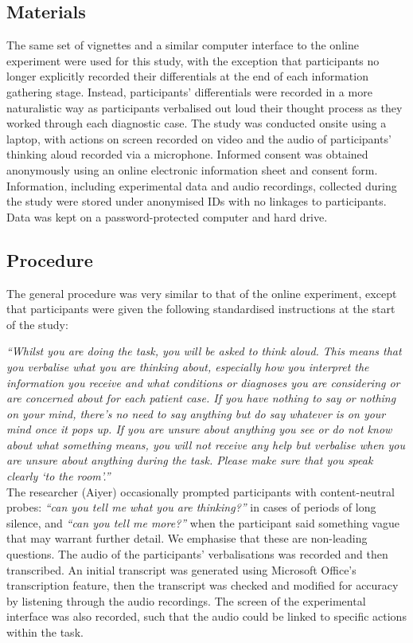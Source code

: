 \documentclass[a4paper, nobind]{templates/ociamthesis}
\begin{document}
\subsection*{Materials}\label{materials-1}

The same set of vignettes and a similar computer interface to the online experiment were used for this study, with the exception that participants no longer explicitly recorded their differentials at the end of each information gathering stage. Instead, participants' differentials were recorded in a more naturalistic way as participants verbalised out loud their thought process as they worked through each diagnostic case. The study was conducted onsite using a laptop, with actions on screen recorded on video and the audio of participants' thinking aloud recorded via a microphone. Informed consent was obtained anonymously using an online electronic information sheet and consent form. Information, including experimental data and audio recordings, collected during the study were stored under anonymised IDs with no linkages to participants. Data was kept on a password-protected computer and hard drive.

\subsection*{Procedure}\label{procedure-1}

The general procedure was very similar to that of the online experiment, except that participants were given the following standardised instructions at the start of the study:

\hfill\break
\emph{``Whilst you are doing the task, you will be asked to think aloud. This means that you verbalise what you are thinking about, especially how you interpret the information you receive and what conditions or diagnoses you are considering or are concerned about for each patient case. If you have nothing to say or nothing on your mind, there's no need to say anything but do say whatever is on your mind once it pops up. If you are unsure about anything you see or do not know about what something means, you will not receive any help but verbalise when you are unsure about anything during the task. Please make sure that you speak clearly `to the room'.''}\\

The researcher (Aiyer) occasionally prompted participants with content-neutral probes: \emph{``can you tell me what you are thinking?''} in cases of periods of long silence, and \emph{``can you tell me more?''} when the participant said something vague that may warrant further detail. We emphasise that these are non-leading questions. The audio of the participants' verbalisations was recorded and then transcribed. An initial transcript was generated using Microsoft Office's transcription feature, then the transcript was checked and modified for accuracy by listening through the audio recordings. The screen of the experimental interface was also recorded, such that the audio could be linked to specific actions within the task.
\end{document}
